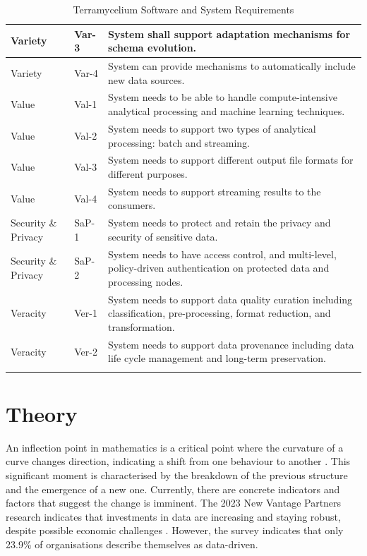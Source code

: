 \documentclass[preprint,12pt]{elsarticle}
\begin{document}
\begin{longtable}{|p{2cm}|p{1cm}|p{9cm}|}
    \hline
    Variety & Var-3 & System shall support adaptation mechanisms for schema evolution. \\
    \hline
    Variety & Var-4 & System can provide mechanisms to automatically include new data sources. \\
    \hline
    Value & Val-1 & System needs to be able to handle compute-intensive analytical processing and machine learning techniques. \\
    \hline
    Value & Val-2 & System needs to support two types of analytical processing: batch and streaming. \\
    \hline
    Value & Val-3 & System needs to support different output file formats for different purposes. \\
    \hline
    Value & Val-4 & System needs to support streaming results to the consumers. \\
    \hline
    Security \& Privacy & SaP-1 & System needs to protect and retain the privacy and security of sensitive data. \\
    \hline
    Security \& Privacy & SaP-2 & System needs to have access control, and multi-level, policy-driven authentication on protected data and processing nodes. \\
    \hline
    Veracity & Ver-1 & System needs to support data quality curation including classification, pre-processing, format reduction, and transformation. \\
    \hline
    Veracity & Ver-2 & System needs to support data provenance including data life cycle management and long-term preservation. \\
    \hline
    \caption{Terramycelium Software and System Requirements}
    \label{table:systemRequirements}
\end{longtable}

\section{Theory}

\label{sec:theory}

An inflection point in mathematics is a critical point where the curvature of a curve changes direction, indicating a shift from one behaviour to another \cite{inflectionPoint}. This significant moment is characterised by the breakdown of the previous structure and the emergence of a new one. Currently, there are concrete indicators and factors that suggest the change is imminent. The 2023 New Vantage Partners research indicates that investments in data are increasing and staying robust, despite possible economic challenges \cite{newvantagepartners2023}. However, the survey indicates that only 23.9\% of organisations describe themselves as data-driven. 
\end{document}
